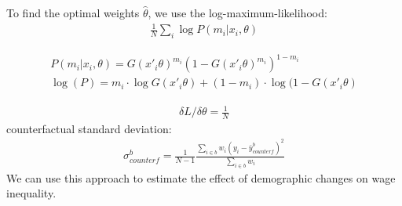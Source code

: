 \documentclass[10pt,a4paper, oneside]{book}
\begin{document}
To find the optimal weights $\hat{\theta}$, we use the log-maximum-likelihood:
\begin{align*}
    \frac{1}{N}\sum_i \log P(m_i|x_i, \theta)
\end{align*}

\begin{align*}
    P(m_i|x_i, \theta) = G(x'_i\theta)^{m_i}(1- G(x'_i\theta)^{m_i})^{1-m_i} \\
    \log(P) = m_i \cdot \log G(x'_i\theta) + (1-m_i)\cdot \log (1- G(x'_i\theta)
\end{align*}

\begin{align*}
    \delta L / \delta \theta = \frac{1}{N}
\end{align*}
counterfactual standard deviation:
\begin{align*}
    \sigma_{counterf}^b = \frac{1}{N-1}\frac{\sum_{i \in b}{w_i(y_i - \bar{y}^b_{counterf})^2}}{\sum_{i \in b}w_i}
\end{align*}
We can use this approach to estimate the effect of demographic changes on wage inequality. 
\end{document}
